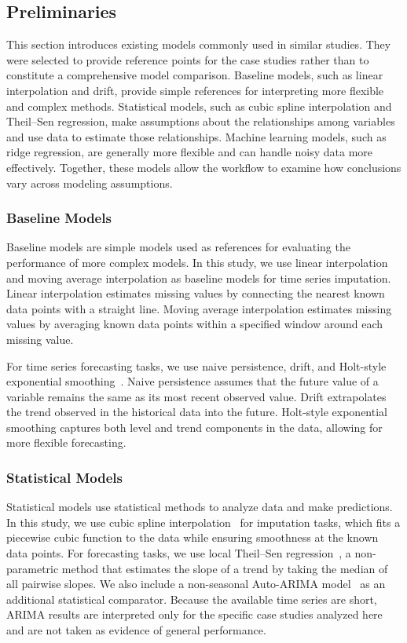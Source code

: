 \subsection{Preliminaries}

This section introduces existing models commonly used in similar studies.
They were selected to provide reference points for the case studies rather than to constitute a comprehensive model comparison.
Baseline models, such as linear interpolation and drift, provide simple references for interpreting more flexible and complex methods.
Statistical models, such as cubic spline interpolation and Theil–Sen regression, make assumptions about the relationships among variables and use data to estimate those relationships.
Machine learning models, such as ridge regression, are generally more flexible and can handle noisy data more effectively.
Together, these models allow the workflow to examine how conclusions vary across modeling assumptions.

\subsubsection{Baseline Models}

Baseline models are simple models used as references for evaluating the performance of more complex models.
In this study, we use linear interpolation and moving average interpolation as baseline models for time series imputation.
Linear interpolation estimates missing values by connecting the nearest known data points with a straight line.
Moving average interpolation estimates missing values by averaging known data points within a specified window around each missing value.

For time series forecasting tasks, we use naive persistence, drift, and Holt-style exponential smoothing~\cite{holt2004forecasting}.
Naive persistence assumes that the future value of a variable remains the same as its most recent observed value.
Drift extrapolates the trend observed in the historical data into the future.
Holt-style exponential smoothing captures both level and trend components in the data, allowing for more flexible forecasting.

\subsubsection{Statistical Models}

Statistical models use statistical methods to analyze data and make predictions.
In this study, we use cubic spline interpolation~\cite{de1978practical} for imputation tasks, which fits a piecewise cubic function to the data while ensuring smoothness at the known data points.
For forecasting tasks, we use local Theil--Sen regression~\cite{sen1968estimates}, a non-parametric method that estimates the slope of a trend by taking the median of all pairwise slopes.
We also include a non-seasonal Auto-ARIMA model~\cite{box2015time} as an additional statistical comparator.
Because the available time series are short, ARIMA results are interpreted only for the specific case studies analyzed here and are not taken as evidence of general performance.

